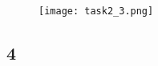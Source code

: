     \begin{figure}[h!]
        \centering
        \texttt{[image: task2\_3.png]}
    \end{figure}


\subsection*{4}
